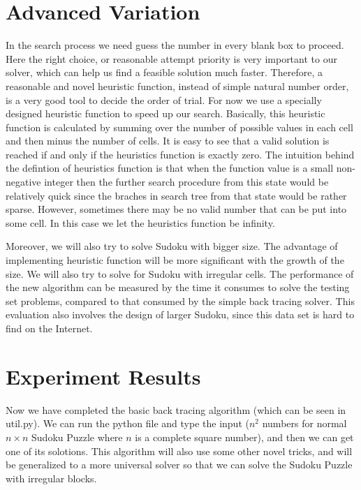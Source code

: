 \documentclass[12pt]{article}
\begin{document}
\begin{spacing}{1.1}
\section{Advanced Variation}
In the search process we need guess the number in every blank box to proceed. Here the right choice, or reasonable attempt priority is very important to our solver, which can help us find a feasible solution much faster. Therefore, a reasonable and novel heuristic function, instead of simple natural number order, is a very good tool to decide the order of trial. For now we use a specially designed heuristic function to speed up our search. Basically, this heuristic function is calculated by summing over the number of possible values in each cell and then minus the number of cells. It is easy to see that a valid solution is reached if and only if the heuristics function is exactly zero.  The intuition behind the defintion of heuristics function is that when the function value is a small non-negative integer then the further search procedure from this state would be relatively quick since the braches in search tree from that state would be rather sparse. However, sometimes there may be no valid number that can be put into some cell. In this case we let the heuristics function be infinity.

Moreover, we will also try to solve Sudoku with bigger size. The advantage of implementing heuristic function will be more significant with the growth of the size. We will also try to solve for Sudoku with irregular cells. The performance of the new algorithm can be measured by the time it consumes to solve the testing set problems, compared to that consumed by the simple back tracing solver. This evaluation also involves the design of larger Sudoku, since this data set is hard to find on the Internet.

\section{Experiment Results}
Now we have completed the basic back tracing algorithm (which can be seen in util.py). We can run the python file and type the input ($n^2$ numbers for normal $n\times n$ Sudoku Puzzle where $n$ is a complete square number), and then we can get one of its solotions. This algorithm will also use some other novel tricks, and will be generalized to a more universal solver so that we can solve the Sudoku Puzzle with irregular blocks.


\end{spacing}
\end{document}
